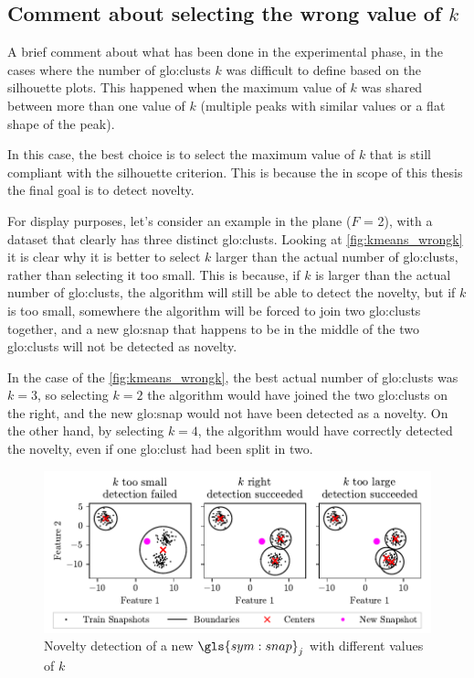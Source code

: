\subsection{Comment about selecting the wrong value of $k$}
\label{sec:wrong_k}
A brief comment about what has been done in the experimental phase, in the cases where the number of \gls{glo:clust}s $k$ was difficult to define based on the silhouette plots. This happened when the maximum value of $k$ was shared between more than one value of $k$ (multiple peaks with similar values or a flat shape of the peak).

In this case, the best choice is to select the maximum value of $k$ that is still compliant with the silhouette criterion. This is because the in scope of this thesis the final goal is to detect novelty. 

For display purposes, let's consider an example in the plane ($F$ = 2), with a dataset that clearly has three distinct \gls{glo:clust}s. Looking at \autoref{fig:kmeans_wrongk} it is clear why it is better to select $k$ larger than the actual number of \gls{glo:clust}s, rather than selecting it too small. This is because, if $k$ is larger than the actual number of \gls{glo:clust}s, the algorithm will still be able to detect the novelty, but if $k$ is too small, somewhere the algorithm will be forced to join two \gls{glo:clust}s together, and a new {\gls{glo:snap}} that happens to be in the middle of the two \gls{glo:clust}s will not be detected as novelty. 

In the case of the \autoref{fig:kmeans_wrongk}, the best actual number of \gls{glo:clust}s was $k=3$, so selecting $k=2$ the algorithm would have joined the two \gls{glo:clust}s on the right, and the new {\gls{glo:snap}} would not have been detected as a novelty. On the other hand, by selecting $k=4$, the algorithm would have correctly detected the novelty, even if one \gls{glo:clust} had been split in two.

\begin{figure}
  \centering
  \includegraphics[width=\textwidth]{images/Kmeans/Kmeans_wrongk.pdf}
  \caption{Novelty detection of a new $\gls{sym:snap}_j$ with different values of $k$}
  \label{fig:kmeans_wrongk}
\end{figure}


